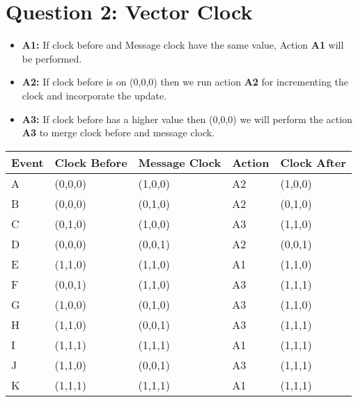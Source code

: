 \section{Question 2: Vector Clock}

\begin{itemize}
	\item \textbf{A1:}	If clock before and Message clock have the same value, Action \textbf{A1} will be performed.
	\item \textbf{A2:} If clock before is on (0,0,0) then we run action \textbf{A2} for incrementing the clock and incorporate the update.
	\item \textbf{A3:} If clock before has a higher value then (0,0,0) we will perform the action \textbf{A3} to merge clock before and message clock.
\end{itemize}


\begin{tabularx}{\columnwidth}{|X|X|X|X|X|}
  \hline
  Event & Clock Before & Message Clock & Action & Clock After\\
  \hline
  A & (0,0,0) & (1,0,0) & A2 & (1,0,0)\\
  \hline
  B & (0,0,0) & (0,1,0) & A2 & (0,1,0)\\
  \hline
  C & (0,1,0) & (1,0,0) & A3 & (1,1,0)\\
  \hline
  D & (0,0,0) & (0,0,1) & A2 & (0,0,1)\\
  \hline
  E & (1,1,0) & (1,1,0) & A1 & (1,1,0)\\
  \hline
  F & (0,0,1) & (1,1,0) & A3 & (1,1,1)\\
  \hline
  G & (1,0,0) & (0,1,0) & A3 & (1,1,0)\\
  \hline
  H & (1,1,0) & (0,0,1) & A3 & (1,1,1)\\
  \hline
  I & (1,1,1) & (1,1,1) & A1 & (1,1,1)\\
  \hline
  J & (1,1,0) & (0,0,1) & A3 & (1,1,1)\\
  \hline
  K & (1,1,1) & (1,1,1) & A1 & (1,1,1)\\
  \hline
\end{tabularx}